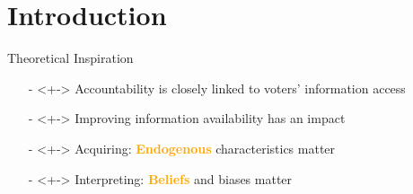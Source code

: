 \section{Introduction}
\frame{\sectionpage}
\begin{frame}{Theoretical Inspiration}
     
    
    \begin{itemize}
        \item[-]<+-> Accountability is closely linked to voters' information access {\scriptsize \citep{przeworski1999democracy}}
        \item[-]<+-> Improving information availability has an impact {\scriptsize \citep{alesina2007bureaucrats,besley2006handcuffs,majumdar2004politics,persson2000political}}
    \end{itemize}
    
    \vspace{10pt}
    \begin{itemize}
        \item[-]<+-> Acquiring: \textcolor<8>{orange}{\textbf<8>{Endogenous}} characteristics matter {\scriptsize \citep{downs1957economic}}
        \item[-]<+-> Interpreting: \textcolor<8>{orange}{\textbf<8>{Beliefs}} and biases matter {\scriptsize \citep{rabin1998psychology}} 
    \end{itemize}
    
\end{frame}

